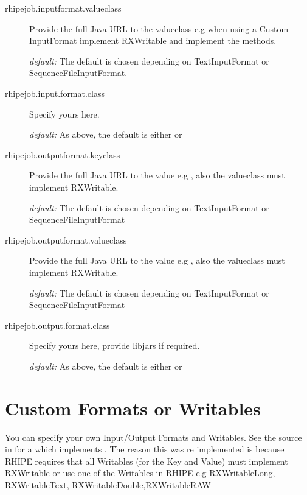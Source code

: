 \documentclass[letterpaper,10pt,english]{manual}
\begin{document}
\begin{description}
\item[rhipejob.inputformat.valueclass]
Provide the full Java URL to the valueclass e.g  when using a Custom InputFormat implement RXWritable and implement the methods.

\emph{default:}      The default is chosen depending on TextInputFormat or SequenceFileInputFormat.

\item[rhipejob.input.format.class]
Specify yours here.

\emph{default:}      As above, the default is either  or 

\item[rhipejob.outputformat.keyclass]
Provide the full Java URL to the value e.g  , also the valueclass must implement RXWritable.

\emph{default:} The default is chosen depending on TextInputFormat or SequenceFileInputFormat

\item[rhipejob.outputformat.valueclass]
Provide the full Java URL to the value e.g  , also the valueclass must implement RXWritable.

\emph{default:} The default is chosen depending on TextInputFormat or SequenceFileInputFormat

\item[rhipejob.output.format.class]
Specify yours here, provide libjars if required.

\emph{default:} As above, the default is either  or 

\end{description}


\section{Custom Formats or Writables}

You can specify your own Input/Output Formats and Writables. See the source in
 for a  which implements
. The reason this was re implemented is because RHIPE
requires that all Writables (for the Key and Value) must implement RXWritable or
use one of the Writables in RHIPE e.g RXWritableLong, RXWritableText,
RXWritableDouble,RXWritableRAW
\end{document}
